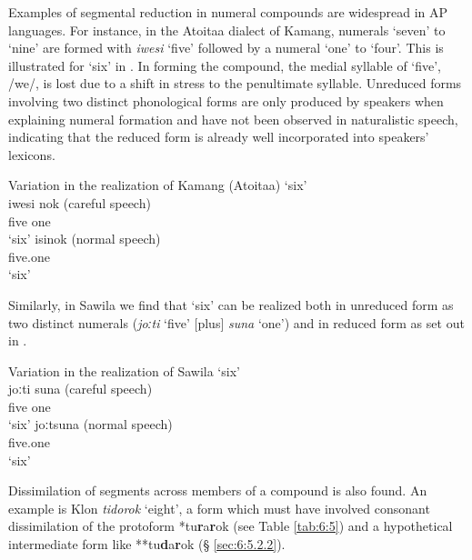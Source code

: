 Examples of segmental reduction in numeral compounds are widespread in AP languages. For instance, in the Atoitaa dialect of Kamang, numerals `seven' to `nine' are formed with \textit{iwesi}\textit{{\ng}} `five' followed by a numeral `one' to `four'. This is illustrated for `six' in . In forming the compound, the medial syllable of `five', /we/, is lost due to a shift in stress to the penultimate syllable. Unreduced forms involving two distinct phonological forms are only produced by speakers when explaining numeral formation and have not been observed in naturalistic speech, indicating that the reduced form is already well incorporated into speakers' lexicons.


 
\ea%
\label{ex:6:1}
\upshape
  Variation in the realization of Kamang (Atoitaa) `six'\\
\ea
\gll iwesi{\ng} nok {    (careful speech)}\\
      five    one    \\
\glt `six'
\ex
\gll isi{\ng}nok        {    (normal speech)}\\
     five.one  \\
\glt`six'
\z
\z 

 
    

Similarly, in Sawila we find that `six' can be realized both in unreduced form as two distinct numerals (\textit{joːti}\textit{{\ng}} `five' [plus] \textit{suna} `one') and in reduced form as set out in .  

 
\ea%
\label{ex:6:2}
\upshape
Variation in the realization of Sawila `six'\\
\ea
\gll joːti{\ng} suna       {\upshape    (careful speech)}\\
    five    one     \\
\glt`six'
\ex
\gll joːtsuna          {\upshape   (normal speech)}\\
      five.one  \\
\glt   `six'
\z
\z 
 

Dissimilation of segments across members of a compound is also found. An example is Klon \textit{tidorok} `eight', a form which must have involved consonant dissimilation of the protoform *tu\textbf{r}a\textbf{r}ok (see Table \ref{tab:6:5}) and a hypothetical intermediate form like **tu\textbf{d}a\textbf{r}ok ({\S} \ref{sec:6:5.2.2}).

